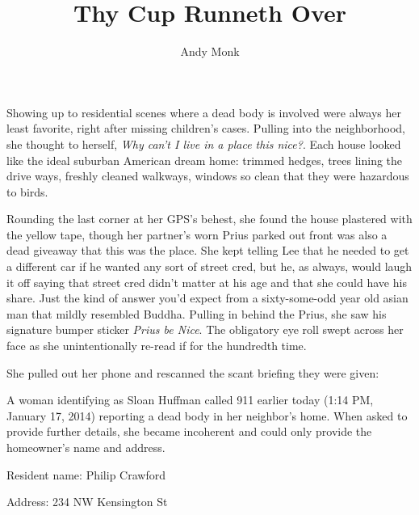 \documentclass[9pt]{memoir}
\title{Thy Cup Runneth Over}
\author{Andy Monk}
\date{}
\begin{document}
\clearpage
\maketitle
\thispagestyle{empty}



\frontmatter


\mainmatter

Showing up to residential scenes where a dead body is involved were always her least favorite, right after missing children's cases. Pulling into the neighborhood, she thought to herself, \textit{Why can't I live in a place this nice?}. Each house looked like the ideal suburban American dream home: trimmed hedges, trees lining the drive ways, freshly cleaned walkways, windows so clean that they were hazardous to birds.

Rounding the last corner at her GPS's behest, she found the house plastered with the yellow tape, though her partner's worn Prius parked out front was also a dead giveaway that this was the place. She kept telling Lee that he needed to get a different car if he wanted any sort of street cred, but he, as always, would laugh it off saying that street cred didn't matter at his age and that she could have his share. Just the kind of answer you'd expect from a sixty-some-odd year old asian man that mildly resembled Buddha. Pulling in behind the Prius, she saw his signature bumper sticker \textit{Prius be Nice}. The obligatory eye roll swept across her face as she unintentionally re-read if for the hundredth time.

She pulled out her phone and rescanned the scant briefing they were given:

\vspace{1em}

\begin{displayquote}
    A woman identifying as Sloan Huffman called 911 earlier today (1:14 PM, January 17, 2014) reporting a dead body in her neighbor's home. When asked to provide further details, she became incoherent and could only provide the homeowner's name and address.

    Resident name: Philip Crawford

    Address: 234 NW Kensington St
\end{displayquote}
\end{document}
